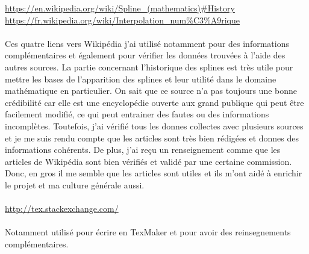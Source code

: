 \documentclass{article}
\begin{document}
{\color{blue}
\url{https://en.wikipedia.org/wiki/Spline_(mathematics)#History}} 
\\
{\color{blue}
\url{https://fr.wikipedia.org/wiki/Interpolation_num%C3%A9rique}} 
\\\\
Ces quatre liens vers Wikip\'{e}dia j'ai utilis\'{e} notamment pour des informations compl\'{e}mentaires et
\'{e}galement pour v\'{e}rifier les donn\'{e}es trouv\'{e}es \`{a} l'aide des autres sources. La partie concernant
l'historique des splines est tr\`{e}s utile pour mettre les bases de l'apparition des splines et leur utilit\'{e}
dans le domaine math\'{e}matique en particulier. On sait que ce source n'a pas toujours une bonne
cr\'{e}dibilit\'{e} car elle est une encyclop\'{e}die ouverte aux grand publique qui peut \^{e}tre facilement modifi\'{e},
ce qui peut entrainer des fautes ou des informations incompl\`{e}tes. Toutefois, j'ai v\'{e}rifi\'{e} tous les
donnes collectes avec plusieurs sources et je me suis rendu compte que les articles sont tr\`{e}s bien
r\'{e}dig\'{e}es et donnes des informations coh\'{e}rents. De plus, j'ai re\c{c}u un renseignement comme que les
articles de Wikip\'{e}dia sont bien v\'{e}rifi\'{e}s et valid\'{e} par une certaine commission. Donc, en gros il me
semble que les articles sont utiles et ils m'ont aid\'{e} \`{a} enrichir le projet et ma culture g\'{e}n\'{e}rale aussi.
\\\\
{\color{blue}
\url{http://tex.stackexchange.com/}} 
\\\\
Notamment utilis\'{e} pour \'{e}crire en TexMaker et pour avoir des reinsegnements compl\'{e}mentaires.
\\\\
\end{document}
